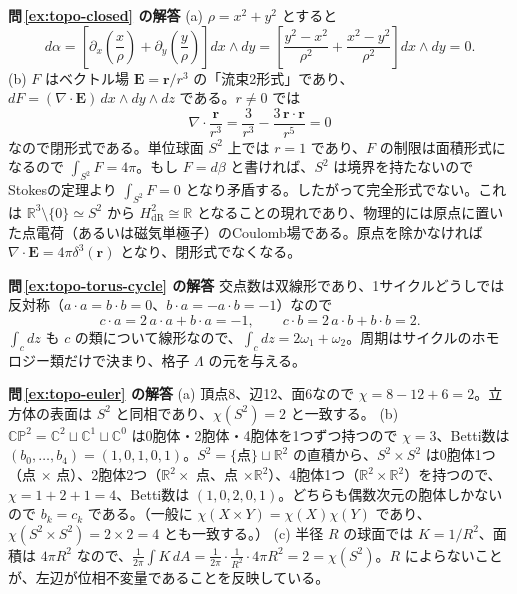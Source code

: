 \documentclass[uplatex, dvipdfmx, book]{jsbook}
\newcommand{\exsol}[1]{\par\medskip\noindent\textbf{問\,\ref{#1} の解答}\quad}
\begin{document}
\exsol{ex:topo-closed}
(a) $\rho = x^2 + y^2$ とすると
\begin{equation*}
    d\alpha = \left[ \partial_x\!\left( \frac{x}{\rho} \right) + \partial_y\!\left( \frac{y}{\rho} \right) \right] dx \wedge dy = \left[ \frac{y^2 - x^2}{\rho^2} + \frac{x^2 - y^2}{\rho^2} \right] dx \wedge dy = 0.
\end{equation*}
(b) $F$ はベクトル場 $\bm{E} = \bm{r}/r^3$ の「流束2形式」であり、$dF = (\nabla \cdot \bm{E})\, dx \wedge dy \wedge dz$ である。$r \neq 0$ では
\begin{equation*}
    \nabla \cdot \frac{\bm{r}}{r^3} = \frac{3}{r^3} - \frac{3\,\bm{r} \cdot \bm{r}}{r^5} = 0
\end{equation*}
なので閉形式である。単位球面 $S^2$ 上では $r = 1$ であり、$F$ の制限は面積形式になるので $\int_{S^2} F = 4\pi$。もし $F = d\beta$ と書ければ、$S^2$ は境界を持たないのでStokesの定理より $\int_{S^2} F = 0$ となり矛盾する。したがって完全形式でない。これは $\mathbb{R}^3 \setminus \{0\} \simeq S^2$ から $H^2_{\mathrm{dR}} \cong \mathbb{R}$ となることの現れであり、物理的には原点に置いた点電荷（あるいは磁気単極子）のCoulomb場である。原点を除かなければ $\nabla \cdot \bm{E} = 4\pi\delta^3(\bm{r})$ となり、閉形式でなくなる。

\exsol{ex:topo-torus-cycle}
交点数は双線形であり、1サイクルどうしでは反対称（$a \cdot a = b \cdot b = 0$、$b \cdot a = -a \cdot b = -1$）なので
\begin{equation*}
    c \cdot a = 2\, a \cdot a + b \cdot a = -1, \qquad c \cdot b = 2\, a \cdot b + b \cdot b = 2.
\end{equation*}
$\int_c dz$ も $c$ の類について線形なので、$\int_c dz = 2\omega_1 + \omega_2$。周期はサイクルのホモロジー類だけで決まり、格子 $\Lambda$ の元を与える。

\exsol{ex:topo-euler}
(a) 頂点8、辺12、面6なので $\chi = 8 - 12 + 6 = 2$。立方体の表面は $S^2$ と同相であり、$\chi(S^2) = 2$ と一致する。
(b) $\mathbb{CP}^2 = \mathbb{C}^2 \sqcup \mathbb{C}^1 \sqcup \mathbb{C}^0$ は0胞体・2胞体・4胞体を1つずつ持つので $\chi = 3$、Betti数は $(b_0, \dots, b_4) = (1, 0, 1, 0, 1)$。$S^2 = \{\text{点}\} \sqcup \mathbb{R}^2$ の直積から、$S^2 \times S^2$ は0胞体1つ（点 $\times$ 点）、2胞体2つ（$\mathbb{R}^2 \times$ 点、点 $\times \mathbb{R}^2$）、4胞体1つ（$\mathbb{R}^2 \times \mathbb{R}^2$）を持つので、$\chi = 1 + 2 + 1 = 4$、Betti数は $(1, 0, 2, 0, 1)$。どちらも偶数次元の胞体しかないので $b_k = c_k$ である。（一般に $\chi(X \times Y) = \chi(X)\chi(Y)$ であり、$\chi(S^2 \times S^2) = 2 \times 2 = 4$ とも一致する。）
(c) 半径 $R$ の球面では $K = 1/R^2$、面積は $4\pi R^2$ なので、$\frac{1}{2\pi}\int K\,dA = \frac{1}{2\pi}\cdot\frac{1}{R^2}\cdot 4\pi R^2 = 2 = \chi(S^2)$。$R$ によらないことが、左辺が位相不変量であることを反映している。
\end{document}
